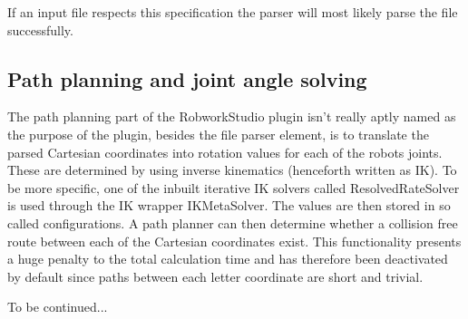 If an input file respects this specification the parser will most likely parse the file successfully.\\



\subsection{Path planning and joint angle solving}
\label{sec:pathplanning}
The path planning part of the RobworkStudio plugin isn't really aptly named as the purpose of the plugin, besides the file parser element, is to translate the parsed Cartesian coordinates into rotation values for each of the robots joints. These are determined by using inverse kinematics (henceforth written as IK). To be more specific, one of the inbuilt iterative IK solvers called ResolvedRateSolver is used through the IK wrapper IKMetaSolver. The values are then stored in so called configurations. A path planner can then determine whether a collision free route between each of the Cartesian coordinates exist. This functionality presents a huge penalty to the total calculation time and has therefore been deactivated by default since paths between each letter coordinate are short and trivial.

To be continued...